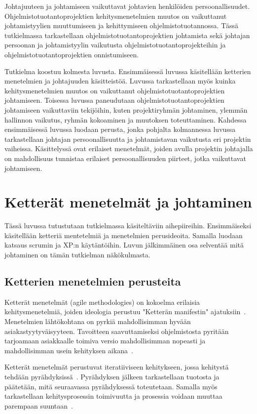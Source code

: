 \documentclass[finnish]{tktltiki2}
\theoremstyle{definition}
\theoremstyle{remark}
\begin{document}
Johtajuuteen ja johtamiseen vaikuttavat johtavien henkilöiden persoonallisuudet. Ohjelmistotuotantoprojektien kehitysmenetelmien muutos on vaikuttanut johtamistyylien muuttumiseen ja kehittymiseen ohjelmistotuotannossa. Tässä tutkielmassa tarkastellaan ohjelmistotuotantoprojektien johtamista sekä johtajan persoonan ja johtamistyylin vaikutusta ohjelmistotuotantoprojekteihin ja ohjelmistotuotantoprojektien onnistumiseen.

Tutkielma koostuu kolmesta luvusta. Ensimmäisessä luvussa käsitellään ketterien menetelmien ja johtajuuden käsitteistöä. Luvussa tarkastellaan myös kuinka kehitysmenetelmien muutos on vaikuttanut ohjelmistotuotantoprojektien johtamiseen. Toisessa luvussa paneudutaan ohjelmistotuotantoprojektien johtamiseen vaikuttaviin tekijöihin, kuten projektiryhmän johtaminen, ylemmän hallinnon vaikutus, ryhmän kokoaminen ja muutoksen toteuttaminen. Kahdessa ensimmäisessä luvussa luodaan perusta, jonka pohjalta kolmannessa luvussa tarkastellaan johtajan persoonallisuutta ja johtamistavan vaikutusta eri projektin vaiheissa. Käsittelyssä ovat erilaiset menetelmät, joiden avulla projektin johtajalla on mahdollisuus tunnistaa erilaiset persoonallisuuden piirteet, jotka vaikuttavat johtamiseen.  

\section{Ketterät menetelmät ja johtaminen}

Tässä luvussa tutustutaan tutkielmassa käsiteltäviin aihepiireihin. Ensimmäiseksi käsitellään ketteriä mentetelmiä ja menetelmien perusideoita. Samalla luodaan katsaus scrumin ja XP:n käytäntöihin. Luvun jälkimmäinen osa selventää mitä johtaminen on tämän tutkielman näkökulmasta.  


\subsection{Ketterien menetelmien perusteita}

Ketterät menetelmät (agile methodologies) on kokoelma erilaisia kehitysmenetelmiä, joiden ideologia perustuu "Ketterän manifestin" ajatuksiin~\cite{fowler2001agile}. Menetelmien lähtökohtana on pyrkiä mahdollisimman hyvään asiakastyytyväisyyteen. Tavoitteen saavuttamiseksi ohjelmistosta pyritään tarjoamaan asiakkaalle toimiva versio mahdollisimman nopeasti ja mahdollisimman usein kehityksen aikana~\cite{fowler2001agile}.

Ketterät menetelmät perustuvat iteratiiviseen kehitykseen, jossa kehitystä tehdään pyrähdyksissä~\cite{cohen2004introduction}. Pyrähdyksen jälkeen tarkastellaan tuotosta ja päätetään, mitä seuraavassa pyrähdyksessä toteutetaan. Samalla myös tarkastellaan kehitysprosessin toimivuutta ja prosessia voidaan muuttaa parempaan suuntaan~\cite{cohen2004introduction}.
\end{document}
